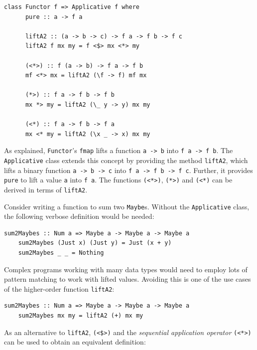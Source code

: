 \documentclass[UdineBachThesis,american,11pt]{PhdThesis}
\begin{document}
  \begin{Verbatim}[gobble=4,fontsize=\small]
    class Functor f => Applicative f where
      pure :: a -> f a

      liftA2 :: (a -> b -> c) -> f a -> f b -> f c
      liftA2 f mx my = f <$> mx <*> my

      (<*>) :: f (a -> b) -> f a -> f b
      mf <*> mx = liftA2 (\f -> f) mf mx

      (*>) :: f a -> f b -> f b
      mx *> my = liftA2 (\_ y -> y) mx my

      (<*) :: f a -> f b -> f a
      mx <* my = liftA2 (\x _ -> x) mx my
  \end{Verbatim}

  As explained, \mbox{\texttt{Functor}}'s \mbox{\texttt{fmap}} lifts a function
  \mbox{\texttt{a -> b}} into \mbox{\texttt{f a -> f b}}. The
  \mbox{\texttt{Applicative}} class extends this concept by providing the method
  \mbox{\texttt{liftA2}}, which lifts a binary function
  \mbox{\texttt{a -> b -> c}} into \mbox{\texttt{f a -> f b -> f c}}. Further,
  it provides \mbox{\texttt{pure}} to lift a value \texttt{a} into
  \mbox{\texttt{f a}}. The functions \mbox{\texttt{(<*>)}}, \mbox{\texttt{(*>)}}
  and \mbox{\texttt{(<*)}} can be derived in terms of \mbox{\texttt{liftA2}}.

  Consider writing a function to sum two \mbox{\texttt{Maybe}s}. Without the
  \mbox{\texttt{Applicative}} class, the following verbose definition would be
  needed:

  \begin{Verbatim}[gobble=4,fontsize=\small]
    sum2Maybes :: Num a => Maybe a -> Maybe a -> Maybe a
    sum2Maybes (Just x) (Just y) = Just (x + y)
    sum2Maybes _ _ = Nothing
  \end{Verbatim}

  Complex programs working with many data types would need to employ lots of
  pattern matching to work with lifted values. Avoiding this is one of the use
  cases of the higher-order function \mbox{\texttt{liftA2}}:

  \begin{Verbatim}[gobble=4,fontsize=\small]
    sum2Maybes :: Num a => Maybe a -> Maybe a -> Maybe a
    sum2Maybes mx my = liftA2 (+) mx my
  \end{Verbatim}

  As an alternative to \mbox{\texttt{liftA2}}, \mbox{\texttt{(<\$>)}} and the
  \emph{sequential application operator} \mbox{\texttt{(<*>)}} can be used to
  obtain an equivalent definition:
\end{document}
